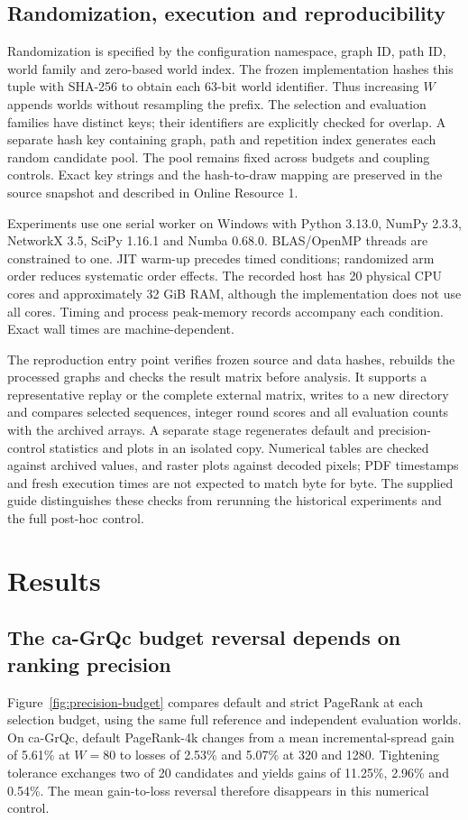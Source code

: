 \documentclass[smallextended]{svjour3}
\begin{document}
\subsection{Randomization, execution and reproducibility}
Randomization is specified by the configuration namespace, graph ID, path ID, world family and zero-based world index. The frozen implementation hashes this tuple with SHA-256 to obtain each 63-bit world identifier. Thus increasing $W$ appends worlds without resampling the prefix. The selection and evaluation families have distinct keys; their identifiers are explicitly checked for overlap. A separate hash key containing graph, path and repetition index generates each random candidate pool. The pool remains fixed across budgets and coupling controls. Exact key strings and the hash-to-draw mapping are preserved in the source snapshot and described in Online Resource 1.

Experiments use one serial worker on Windows with Python 3.13.0, NumPy 2.3.3, NetworkX 3.5, SciPy 1.16.1 and Numba 0.68.0. BLAS/OpenMP threads are constrained to one. JIT warm-up precedes timed conditions; randomized arm order reduces systematic order effects. The recorded host has 20 physical CPU cores and approximately 32 GiB RAM, although the implementation does not use all cores. Timing and process peak-memory records accompany each condition. Exact wall times are machine-dependent.

The reproduction entry point verifies frozen source and data hashes, rebuilds the processed graphs and checks the result matrix before analysis. It supports a representative replay or the complete external matrix, writes to a new directory and compares selected sequences, integer round scores and all evaluation counts with the archived arrays. A separate stage regenerates default and precision-control statistics and plots in an isolated copy. Numerical tables are checked against archived values, and raster plots against decoded pixels; PDF timestamps and fresh execution times are not expected to match byte for byte. The supplied guide distinguishes these checks from rerunning the historical experiments and the full post-hoc control.

\section{Results}
\subsection{The ca-GrQc budget reversal depends on ranking precision}
Figure~\ref{fig:precision-budget} compares default and strict PageRank at each selection budget, using the same full reference and independent evaluation worlds. On ca-GrQc, default PageRank-4k changes from a mean incremental-spread gain of 5.61\% at $W=80$ to losses of 2.53\% and 5.07\% at 320 and 1280. Tightening tolerance exchanges two of 20 candidates and yields gains of 11.25\%, 2.96\% and 0.54\%. The mean gain-to-loss reversal therefore disappears in this numerical control.
\end{document}
